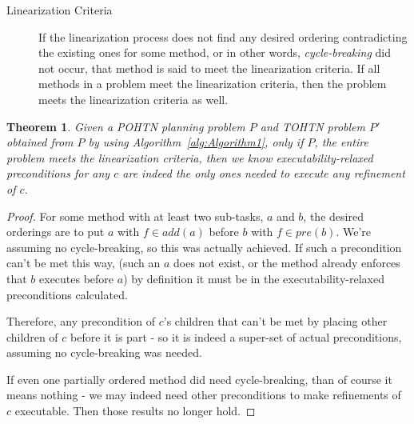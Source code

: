 \documentclass[letterpaper]{article} %
\newtheorem{theorem}{Theorem}
\newcommand{\Pre} {\ensuremath{\mathit{pre}}}  %
\newcommand{\Add} {\ensuremath{\mathit{add}}}
\begin{document}


\begin{description}
	\item[Linearization Criteria] If the linearization process does not find any desired ordering contradicting the existing ones for some method, or in other words, \emph{cycle-breaking} did not occur, that method is said to meet the linearization criteria. If all methods in a problem meet the linearization criteria, then the problem meets the linearization criteria as well. 
\end{description}




\begin{theorem} \label{thm:RelaxedPreconditions}
	Given a POHTN planning problem $P$ and TOHTN problem $P'$ obtained from $P$ by using Algorithm~\ref{alg:Algorithm1}, \emph{only if $P$, the entire problem meets the linearization criteria},
	then we know executability-relaxed preconditions for any $c$ are indeed the only ones needed to execute any refinement of $c$.
\end{theorem}
\begin{proof}
	
	For some method with at least two sub-tasks, $a$ and $b$,
	the desired orderings are to put $a$ with $f \in \Add(a)$ before $b$ with $f \in \Pre(b)$. We're assuming no cycle-breaking, so this was actually achieved. If such a precondition can't be met this way, (such an $a$ does not exist, or the method already enforces that $b$ executes before $a$) by definition it must be in the executability-relaxed preconditions calculated. 

	Therefore, any precondition of $c$'s children that can't be met by placing  other children of $c$ before it is part - so it is indeed a super-set of actual preconditions, assuming no cycle-breaking was needed.
	
	If even one partially ordered method did need cycle-breaking, than of course it means nothing - we may indeed need other preconditions to make refinements of $c$ executable. Then those results no longer hold.
\end{proof}
\end{document}
